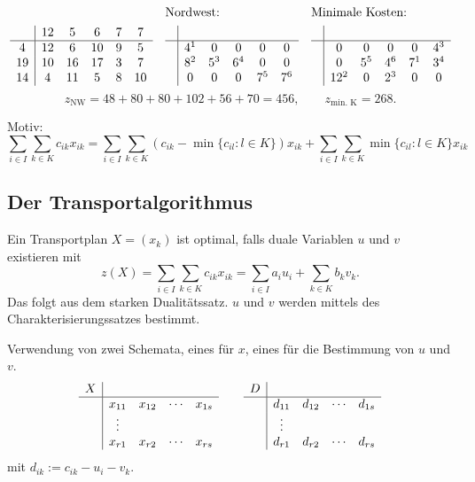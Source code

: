 \begin{exmp} %
  \begin{align*}
    & & &\text{Nordwest:} & &\text{Minimale Kosten:} \\
    &\begin{array}{c|ccccc}
      & 12 & 5 & 6 & 7 & 7 \\
      \hline
      4 & 12 & 6 & 10 & 9 & 5 \\
      19 & 10 & 16 & 17 & 3 & 7 \\
      14 & 4 & 11 & 5 & 8 & 10
    \end{array}
    &
    &\begin{array}{c|ccccc}
       & \\
       \hline
       & 4^1 & 0 & 0 & 0 & 0 \\
       & 8^2 & 5 ^3 & 6^4 & 0 & 0 \\
       & 0   & 0 & 0 & 7^5 & 7^6
    \end{array} &
    &\begin{array}{c|ccccc}
       & \\
       \hline
       & 0 & 0 & 0 & 0 & 4^3 \\
       & 0 & 5^5 & 4^6 & 7^1 & 3^4 \\
       & 12^2 & 0 & 2^3 & 0 & 0
    \end{array}
  \end{align*}
  \[ z_{\text{NW}} = 48 + 80 + 80 + 102 + 56 + 70 = 456, \qquad z_{\text{min.
        K}} = 268. \]
\end{exmp}

Motiv:
\[ \sum_{i \in I}\sum_{k \in K} c_{ik} x_{ik} =
  \sum_{i \in I}\sum_{k \in K} \left( c_{ik} -
    \min \{ c_{il} : l \in K \} \right) x_{ik}
  + \sum_{i \in I}\sum_{k \in K} \min \{ c_{il} : l \in K \} x_{ik}
\]

\subsection{Der Transportalgorithmus}
Ein Transportplan $X = (x_k)$ ist optimal, falls duale Variablen $u$ und $v$
existieren mit
\[ z(X) = \sum_{i \in I} \sum_{k \in K} c_{ik} x_{ik}
  = \sum_{i \in I} a_i u_i + \sum_{k \in K} b_k v_k.\]
Das folgt aus dem starken Dualitätssatz. $u$ und $v$ werden mittels des
Charakterisierungssatzes bestimmt.

Verwendung von zwei Schemata, eines für $x$, eines für die Bestimmung von $u$
und $v$.
\[
  \begin{array}{l|cccc}
    X \\
    \hline
    & x_{11} & x_{12} & \cdots & x_{1s} \\
    & \vdots \\
    & x_{r1} & x_{r2} & \cdots & x_{rs}
  \end{array}
  \qquad
  \begin{array}{l|cccc}
    D \\
    \hline
    & d_{11} & d_{12} & \cdots & d_{1s} \\
    & \vdots \\
    & d_{r1} & d_{r2} & \cdots & d_{rs}
  \end{array}
\]
mit $d_{ik} := c_{ik} - u_i - v_k$.
 
